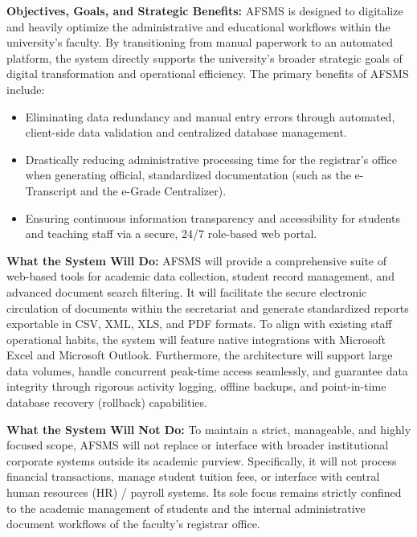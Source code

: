 \documentclass[11pt, a4paper]{article}
\begin{document}
\textbf{Objectives, Goals, and Strategic Benefits:} AFSMS is designed to digitalize and heavily optimize the administrative and educational workflows within the university's faculty. By transitioning from manual paperwork to an automated platform, the system directly supports the university's broader strategic goals of digital transformation and operational efficiency. The primary benefits of AFSMS include:
\begin{itemize}
    \item Eliminating data redundancy and manual entry errors through automated, client-side data validation and centralized database management.
    \item Drastically reducing administrative processing time for the registrar's office when generating official, standardized documentation (such as the e-Transcript and the e-Grade Centralizer).
    \item Ensuring continuous information transparency and accessibility for students and teaching staff via a secure, 24/7 role-based web portal.
\end{itemize}

\textbf{What the System Will Do:} AFSMS will provide a comprehensive suite of web-based tools for academic data collection, student record management, and advanced document search filtering. It will facilitate the secure electronic circulation of documents within the secretariat and generate standardized reports exportable in CSV, XML, XLS, and PDF formats. To align with existing staff operational habits, the system will feature native integrations with Microsoft Excel and Microsoft Outlook. Furthermore, the architecture will support large data volumes, handle concurrent peak-time access seamlessly, and guarantee data integrity through rigorous activity logging, offline backups, and point-in-time database recovery (rollback) capabilities.

\textbf{What the System Will Not Do:} To maintain a strict, manageable, and highly focused scope, AFSMS will not replace or interface with broader institutional corporate systems outside its academic purview. Specifically, it will not process financial transactions, manage student tuition fees, or interface with central human resources (HR) / payroll systems. Its sole focus remains strictly confined to the academic management of students and the internal administrative document workflows of the faculty's registrar office.
\end{document}
